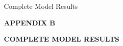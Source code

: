 \newpage


{\qquad\protect{} \hspace{0.5em} Complete Model Results
}

\begin{center}
    \textbf{APPENDIX B}

    \MakeUppercase{\textbf{Complete Model Results}}
    \vspace*{\baselineskip}
\end{center}

